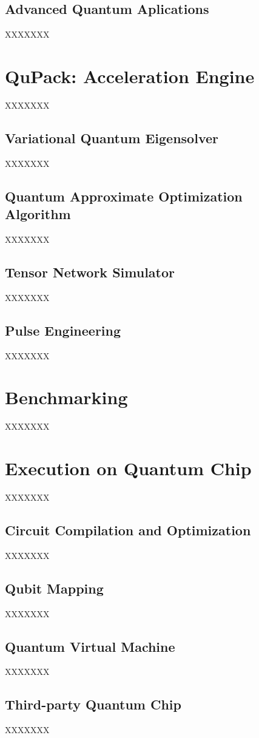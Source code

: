 \documentclass[pra,twocolumn,superscriptaddress,floatfix,nofootinbib,amsmath,amssymb]{revtex4-1}
\begin{document}
\subsection{Advanced Quantum Aplications}
XXXXXXX


\section{QuPack: Acceleration Engine}
XXXXXXX
\subsection{Variational Quantum Eigensolver}
XXXXXXX
\subsection{Quantum Approximate Optimization Algorithm}
XXXXXXX
\subsection{Tensor Network Simulator}
XXXXXXX
\subsection{Pulse Engineering}
XXXXXXX


\section{Benchmarking}
XXXXXXX


\section{Execution on Quantum Chip}
XXXXXXX

\subsection{Circuit Compilation and Optimization}
XXXXXXX

\subsection{Qubit Mapping}
XXXXXXX
\subsection{Quantum Virtual Machine}
XXXXXXX
\subsection{Third-party Quantum Chip}
XXXXXXX



\end{document}
